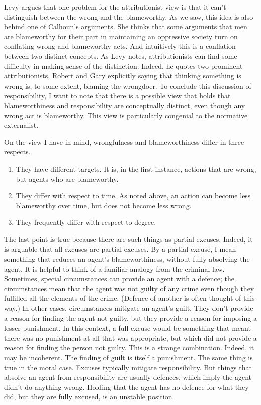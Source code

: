 Levy argues that one problem for the attributionist view is that it can't distinguish between the wrong and the blameworthy. As we saw, this idea is also behind one of Calhoun's arguments. She thinks that some arguments that men are blameworthy for their part in maintaining an oppressive society turn on conflating wrong and blameworthy acts. And intuitively this is a conflation between two distinct concepts. As Levy notes, attributionists can find some difficulty in making sense of the distinction. Indeed, he quotes two prominent attributionists, Robert \citet{Adams1985} and Gary \citet{Watson1996} explicitly saying that thinking something is wrong is, to some extent, blaming the wrongdoer. To conclude this discussion of responsibility, I want to note that there is a possible view that holds that blameworthiness and responsibility are conceptually distinct, even though any wrong act is blameworthy. This view is particularly congenial to the normative externalist.

On the view I have in mind, wrongfulness and blameworthiness differ in three respects.

\begin{enumerate}
\item{} They have different targets. It is, in the first instance, actions that are wrong, but agents who are blameworthy.

\item{} They differ with respect to time. As noted above, an action can become less blameworthy over time, but does not become less wrong.

\item{} They frequently differ with respect to degree.

\end{enumerate}
The last point is true because there are such things as partial excuses. Indeed, it is arguable that all excuses are partial excuses. By a partial excuse, I mean something that reduces an agent's blameworthiness, without fully absolving the agent. It is helpful to think of a familiar analogy from the criminal law. Sometimes, special circumstances can provide an agent with a defence; the circumstances mean that the agent was not guilty of any crime even though they fulfilled all the elements of the crime. (Defence of another is often thought of this way.) In other cases, circumstances mitigate an agent's guilt. They don't provide a reason for finding the agent not guilty, but they provide a reason for imposing a lesser punishment. In this context, a full excuse would be something that meant there was no punishment at all that was appropriate, but which did not provide a reason for finding the person not guilty. This is a strange combination. Indeed, it may be incoherent. The finding of guilt is itself a punishment. The same thing is true in the moral case. Excuses typically mitigate responsibility. But things that absolve an agent from responsibility are usually defences, which imply the agent didn't do anything wrong. Holding that the agent has no defence for what they did, but they are fully excused, is an unstable position.

